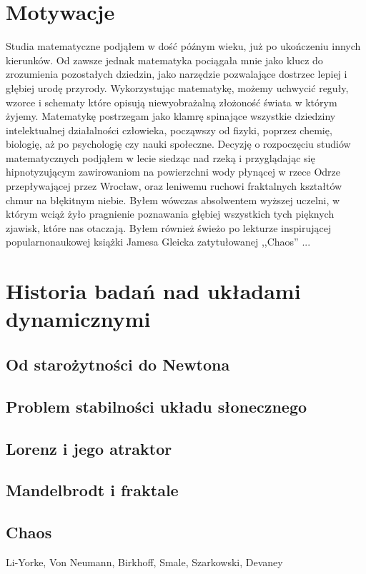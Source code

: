 \documentclass[licencjacka]{pwr_wmat_praca_dyplomowa}
\theoremstyle{plain}
\numberwithin{theorem}{chapter}
\theoremstyle{definition}
\numberwithin{theorem}{chapter}
\begin{document}
\section{Motywacje}
Studia matematyczne podjąłem w dość późnym wieku, już po ukończeniu innych kierunków. Od zawsze jednak matematyka pociągała mnie jako klucz do zrozumienia pozostałych dziedzin, jako narzędzie pozwalające dostrzec lepiej i głębiej urodę przyrody. Wykorzystując matematykę, możemy uchwycić reguły, wzorce i schematy które opisują niewyobrażalną złożoność świata w którym żyjemy. Matematykę postrzegam jako klamrę spinające wszystkie dziedziny intelektualnej działalności człowieka, począwszy od fizyki, poprzez chemię, biologię, aż po psychologię czy nauki społeczne. Decyzję o rozpoczęciu studiów matematycznych podjąłem w lecie siedząc nad rzeką i przyglądając się hipnotyzującym zawirowaniom na powierzchni wody płynącej w rzece Odrze przepływającej przez Wrocław, oraz leniwemu ruchowi fraktalnych kształtów chmur na błękitnym niebie. Byłem wówczas absolwentem wyższej uczelni, w którym wciąż żyło pragnienie poznawania głębiej wszystkich tych pięknych zjawisk, które nas otaczają. Byłem również świeżo po lekturze inspirującej popularnonaukowej książki Jamesa Gleicka zatytułowanej ,,Chaos'' \cite{gleick1987chaos}...
\section{Historia badań nad układami dynamicznymi}
\subsection{Od starożytności do Newtona}
\subsection{Problem stabilności układu słonecznego}
\subsection{Lorenz i jego atraktor}
\subsection{Mandelbrodt i fraktale}
\subsection{Chaos}
Li-Yorke, Von Neumann, Birkhoff, Smale, Szarkowski, Devaney
\end{document}
